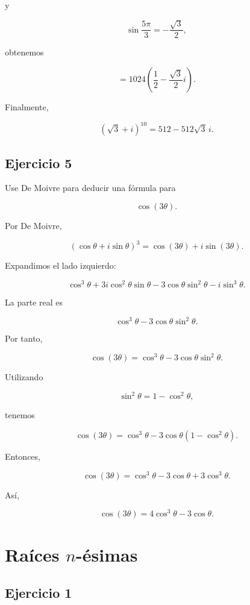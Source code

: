 \documentclass[12pt]{article}
\begin{document}
y

\[
\sin\frac{5\pi}{3}
=
-\frac{\sqrt3}{2},
\]

obtenemos

\[
=
1024
\left(
\frac12-\frac{\sqrt3}{2}i
\right).
\]

Finalmente,

\[
\boxed{
(\sqrt3+i)^{10}
=
512-512\sqrt3\,i
}.
\]


\subsection*{Ejercicio 5}

Use De Moivre para deducir una fórmula para

\[
\cos(3\theta).
\]

Por De Moivre,

\[
(\cos\theta+i\sin\theta)^3
=
\cos(3\theta)+i\sin(3\theta).
\]

Expandimos el lado izquierdo:

\[
\cos^3\theta
+
3i\cos^2\theta\sin\theta
-
3\cos\theta\sin^2\theta
-
i\sin^3\theta.
\]

La parte real es

\[
\cos^3\theta
-
3\cos\theta\sin^2\theta.
\]

Por tanto,

\[
\cos(3\theta)
=
\cos^3\theta
-
3\cos\theta\sin^2\theta.
\]

Utilizando

\[
\sin^2\theta
=
1-\cos^2\theta,
\]

tenemos

\[
\cos(3\theta)
=
\cos^3\theta
-
3\cos\theta(1-\cos^2\theta).
\]

Entonces,

\[
\cos(3\theta)
=
\cos^3\theta
-3\cos\theta
+3\cos^3\theta.
\]

Así,

\[
\boxed{
\cos(3\theta)
=
4\cos^3\theta-3\cos\theta
}.
\]

\section*{Raíces \(n\)-ésimas}

\subsection*{Ejercicio 1}
\end{document}
